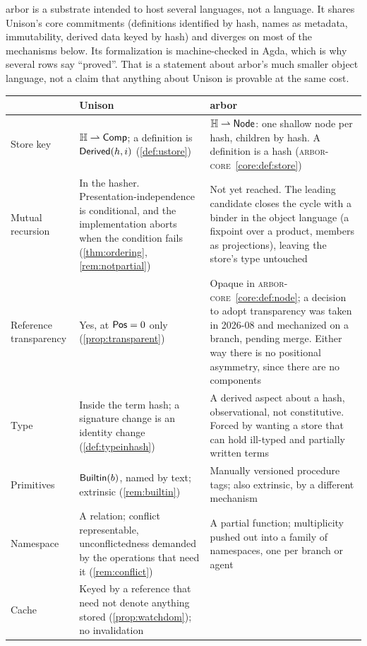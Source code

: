 \documentclass[11pt]{article}
\theoremstyle{definition}
\theoremstyle{plain}
\theoremstyle{remark}
\newcommand{\arborcore}{\textsc{arbor-core}}
\newcommand{\coreref}[1]{\arborcore~\cref{core:#1}}
\begin{document}
arbor is a substrate intended to host several languages, not a language. It shares Unison's core
commitments (definitions identified by hash, names as metadata, immutability, derived data keyed by
hash) and diverges on most of the mechanisms below. Its formalization is machine-checked in Agda,
which is why several rows say ``proved''. That is a statement about arbor's much smaller object
language, not a claim that anything about Unison is provable at the same cost.

\begin{center}
\small
\begin{tabular}{@{}p{}p{}p{}@{}}
\toprule
& \textbf{Unison} & \textbf{arbor} \\
\midrule
Store key
& $\mathbb{H} \rightharpoonup \mathsf{Comp}$; a definition is $\mathsf{Derived}(h,i)$ (\cref{def:ustore})
& $\mathbb{H} \rightharpoonup \mathsf{Node}$: one shallow node per hash, children by hash. A definition is a hash
  (\coreref{def:store}) \\
\addlinespace
Mutual recursion
& In the hasher. Presentation-independence is conditional, and the implementation aborts when the
  condition fails (\cref{thm:ordering}, \cref{rem:notpartial})
& Not yet reached. The leading candidate closes the cycle with a binder in the object language (a
  fixpoint over a product, members as projections), leaving the store's type untouched \\
\addlinespace
Reference transparency
& Yes, at $\mathsf{Pos} = 0$ only (\cref{prop:transparent})
& Opaque in \coreref{def:node}; a decision to adopt transparency was taken in 2026-08 and mechanized
  on a branch, pending merge. Either way there is no positional asymmetry, since there are no
  components \\
\addlinespace
Type
& Inside the term hash; a signature change is an identity change (\cref{def:typeinhash})
& A derived aspect about a hash, observational, not constitutive. Forced by wanting a store that can
  hold ill-typed and partially written terms \\
\addlinespace
Primitives
& $\mathsf{Builtin}(b)$, named by text; extrinsic (\cref{rem:builtin})
& Manually versioned procedure tags; also extrinsic, by a different mechanism \\
\addlinespace
Namespace
& A relation; conflict representable, unconflictedness demanded by the operations that need it
  (\cref{rem:conflict})
& A partial function; multiplicity pushed out into a family of namespaces, one per branch or agent \\
\addlinespace
Cache
& Keyed by a reference that need not denote anything stored (\cref{prop:watchdom}); no invalidation

\end{tabular}
\end{center}
\end{document}

